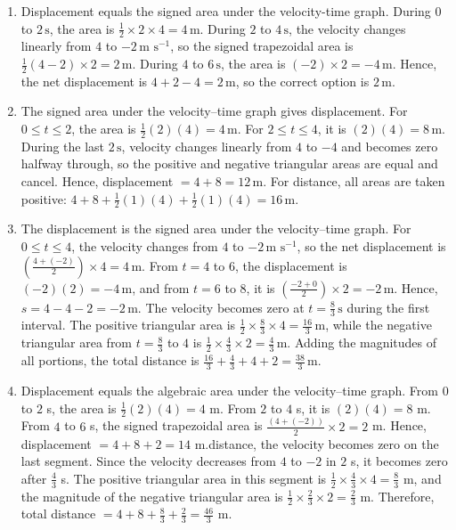 \documentclass[11pt,a4paper]{article}
\begin{document}
\begin{enumerate}
\item Displacement equals the signed area under the velocity-time graph. During $0$ to $2\,\text{s}$, the area is $\frac{1}{2}\times 2\times 4=4\,\text{m}$. During $2$ to $4\,\text{s}$, the velocity changes linearly from $4$ to $-2\,\text{m s}^{-1}$, so the signed trapezoidal area is $\frac{1}{2}(4-2)\times 2=2\,\text{m}$. During $4$ to $6\,\text{s}$, the area is $(-2)\times 2=-4\,\text{m}$. Hence, the net displacement is $4+2-4=2\,\text{m}$, so the correct option is $\boxed{2\,\text{m}}$.
\item The signed area under the velocity–time graph gives displacement. For $0\le t\le2$, the area is $\frac12(2)(4)=4\,\text{m}$. For $2\le t\le4$, it is $(2)(4)=8\,\text{m}$. During the last $2\,\text{s}$, velocity changes linearly from $4$ to $-4$ and becomes zero halfway through, so the positive and negative triangular areas are equal and cancel. Hence, displacement $=4+8=12\,\text{m}$. For distance, all areas are taken positive: $4+8+\frac12(1)(4)+\frac12(1)(4)=16\,\text{m}$.
\item The displacement is the signed area under the velocity–time graph. For $0\leq t\leq4$, the velocity changes from $4$ to $-2\,\text{m s}^{-1}$, so the net displacement is $\left(\frac{4+(-2)}{2}\right)\times4=4\,\text{m}$. From $t=4$ to $6$, the displacement is $(-2)(2)=-4\,\text{m}$, and from $t=6$ to $8$, it is $\left(\frac{-2+0}{2}\right)\times2=-2\,\text{m}$. Hence, $s=4-4-2=-2\,\text{m}$. The velocity becomes zero at $t=\frac{8}{3}\,\text{s}$ during the first interval. The positive triangular area is $\frac12\times\frac83\times4=\frac{16}{3}\,\text{m}$, while the negative triangular area from $t=\frac83$ to $4$ is $\frac12\times\frac43\times2=\frac43\,\text{m}$. Adding the magnitudes of all portions, the total distance is $\frac{16}{3}+\frac{4}{3}+4+2=\frac{38}{3}\,\text{m}$.
\item Displacement equals the algebraic area under the velocity–time graph. From $0$ to $2$ s, the area is $\frac12(2)(4)=4$ m. From $2$ to $4$ s, it is $(2)(4)=8$ m. From $4$ to $6$ s, the signed trapezoidal area is $\frac{(4+(-2))}{2}\times 2=2$ m. Hence, displacement $=4+8+2=14$ m.\n\nFor distance, the velocity becomes zero on the last segment. Since the velocity decreases from $4$ to $-2$ in $2$ s, it becomes zero after $\frac{4}{3}$ s. The positive triangular area in this segment is $\frac12\times\frac43\times4=\frac83$ m, and the magnitude of the negative triangular area is $\frac12\times\frac23\times2=\frac23$ m. Therefore, total distance $=4+8+\frac83+\frac23=\frac{46}{3}$ m.

\end{enumerate}
\end{document}
